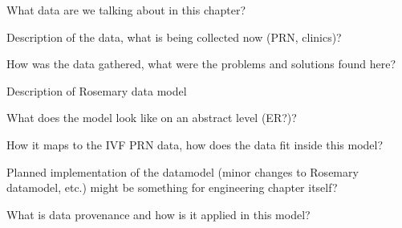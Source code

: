 What data are we talking about in this chapter?

Description of the data, what is being collected now (PRN, clinics)?

How was the data gathered, what were the problems and solutions found here?

Description of Rosemary data model

What does the model look like on an abstract level (ER?)?

How it maps to the IVF PRN data, how does the data fit inside this model?

Planned implementation of the datamodel (minor changes to Rosemary datamodel, etc.) {might be something for engineering chapter itself?}

What is data provenance and how is it applied in this model?